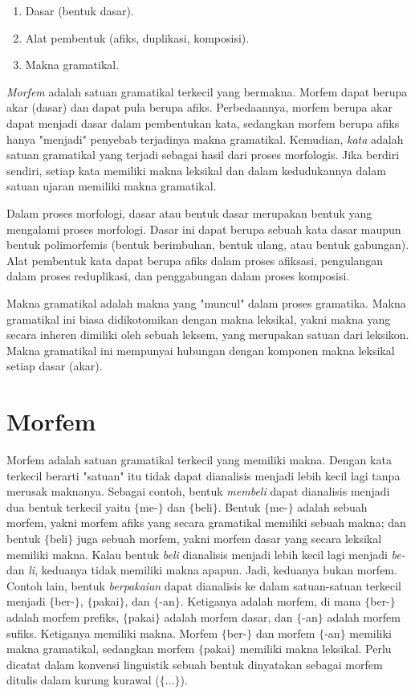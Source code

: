 \begin{enumerate}
	\item Dasar (bentuk dasar).
	\item Alat pembentuk (afiks, duplikasi, komposisi).
	\item Makna gramatikal.
\end{enumerate}

\textit{Morfem} adalah satuan gramatikal terkecil yang bermakna. Morfem dapat berupa akar (dasar) dan dapat pula berupa afiks. Perbedaannya, morfem berupa akar dapat menjadi dasar dalam pembentukan kata, sedangkan morfem berupa afiks hanya "menjadi" penyebab terjadinya makna gramatikal. Kemudian, \textit{kata} adalah satuan gramatikal yang terjadi sebagai hasil dari proses morfologis. Jika berdiri sendiri, setiap kata memiliki makna leksikal dan dalam kedudukannya dalam satuan ujaran memiliki makna gramatikal.

Dalam proses morfologi, dasar atau bentuk dasar merupakan bentuk yang mengalami proses morfologi. Dasar ini dapat berupa sebuah kata dasar maupun bentuk polimorfemis (bentuk berimbuhan, bentuk ulang, atau bentuk gabungan). Alat pembentuk kata dapat berupa afiks dalam proses afiksasi, pengulangan dalam proses reduplikasi, dan penggabungan dalam proses komposisi. 

Makna gramatikal adalah makna yang "muncul" dalam proses gramatika. Makna gramatikal ini biasa didikotomikan dengan makna leksikal, yakni makna yang secara inheren dimiliki oleh sebuah leksem, yang merupakan satuan dari leksikon. Makna gramatikal ini mempunyai hubungan dengan komponen makna leksikal setiap dasar (akar).


\section{Morfem}
\label{sec:morfem}

Morfem adalah satuan gramatikal terkecil yang memiliki makna\cite{chaer:08:morfologi}. Dengan kata terkecil berarti "satuan" itu tidak dapat dianalisis menjadi lebih kecil lagi tanpa merusak maknanya. Sebagai contoh, bentuk \textit{membeli} dapat dianalisis menjadi dua bentuk terkecil yaitu $\lbrace$me-$\rbrace$ dan $\lbrace$beli$\rbrace$. Bentuk $\lbrace$me-$\rbrace$ adalah sebuah morfem, yakni morfem afiks yang secara gramatikal memiliki sebuah makna; dan bentuk $\lbrace$beli$\rbrace$ juga sebuah morfem, yakni morfem dasar yang secara leksikal memiliki makna. Kalau bentuk \textit{beli} dianalisis menjadi lebih kecil lagi menjadi \textit{be-} dan \textit{li}, keduanya tidak memiliki makna apapun. Jadi, keduanya bukan morfem. Contoh lain, bentuk \textit{berpakaian} dapat dianalisis ke dalam satuan-satuan terkecil menjadi $\lbrace$ber-$\rbrace$, $\lbrace$pakai$\rbrace$, dan $\lbrace$-an$\rbrace$. Ketiganya adalah morfem, di mana $\lbrace$ber-$\rbrace$ adalah morfem prefiks, $\lbrace$pakai$\rbrace$ adalah morfem dasar, dan $\lbrace$-an$\rbrace$ adalah morfem sufiks. Ketiganya memiliki makna. Morfem $\lbrace$ber-$\rbrace$ dan morfem $\lbrace$-an$\rbrace$ memiliki makna gramatikal, sedangkan morfem $\lbrace$pakai$\rbrace$ memiliki makna leksikal. Perlu dicatat dalam konvensi linguistik sebuah bentuk dinyatakan sebagai morfem ditulis dalam kurung kurawal ($\lbrace$...$\rbrace$).


